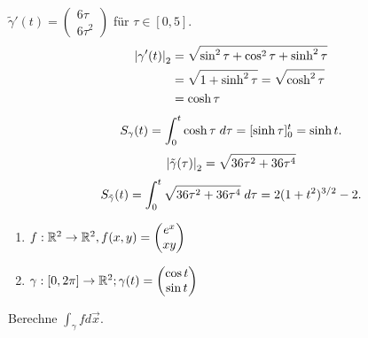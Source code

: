 \documentclass[../ana2u.tex]{subfiles}
\begin{document}
\begin{bsp}
    \( \tilde{\gamma}'(t) = \begin{pmatrix} 6 \tau \\ 6 \tau^2 \end{pmatrix} \) für \( \tau \in [0,5] \).
    \begin{align*}
        \abs{\gamma'(t)}_2 &= \sqrt{ \sin^2 \tau + \cos^2 \tau + \sinh^2 \tau}\\
        &= \sqrt{1 + \sinh^2 \tau} = \sqrt{\cosh^2 \tau}\\
        &= \cosh \tau
    \end{align*}
    \[ S_\gamma (t) = \integralx{\cosh \tau}{0}{t}{\tau} 
    = [\sinh \tau]_0^t = \sinh t. \]    
    \[ \abs{ \tilde{\gamma}(\tau) }_2 = \sqrt{36 \tau^2 + 36 \tau^4} \]
    \[ S_{\tilde{\gamma}}(t) = \integralx{\sqrt{36\tau^2 + 36\tau^4}}{0}{t}{\tau} = 2(1 + t^2)^{3/2} - 2. \]
\end{bsp}
\begin{bsp}
    \begin{enumerate}
        \item \( \abb{f}{\R^2}{\R^2}, f(x,y) = \begin{pmatrix} e^x \\ xy \end{pmatrix} \)
        \item \( \abb{\gamma}{[0,2\pi]}{\R^2}; \gamma(t) = \begin{pmatrix} \cos t \\ \sin t \end{pmatrix} \)
    \end{enumerate}
    Berechne \( \int_\gamma f d\vec{x} \).
\end{bsp}
\end{document}
